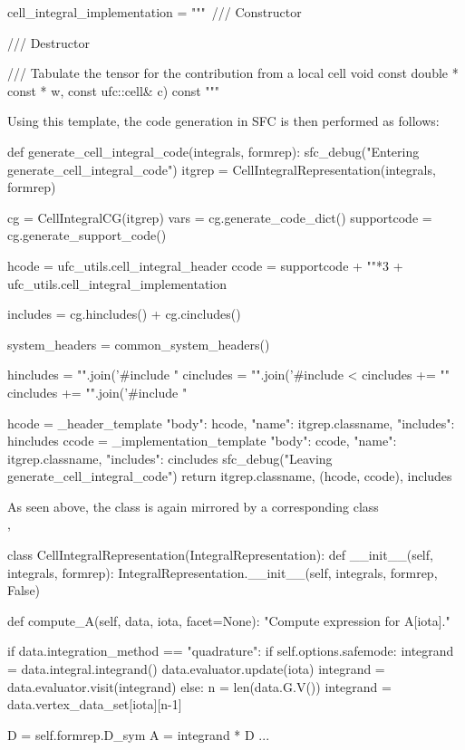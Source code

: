\begin{python}
cell_integral_implementation = """\
/// Constructor
{
}

/// Destructor
{
}

/// Tabulate the tensor for the contribution from a local cell
void %
                                    const double * const * w,
                                    const ufc::cell& c) const
{
}
"""
\end{python}
Using this template, the code generation in SFC is then performed as follows:  
\begin{python}
def generate_cell_integral_code(integrals, formrep):
    sfc_debug("Entering generate_cell_integral_code")
    itgrep = CellIntegralRepresentation(integrals, formrep)
    
    cg = CellIntegralCG(itgrep)
    vars = cg.generate_code_dict()
    supportcode = cg.generate_support_code()

    hcode = ufc_utils.cell_integral_header %
    ccode = supportcode + "\n"*3 + ufc_utils.cell_integral_implementation %
    
    includes = cg.hincludes() + cg.cincludes()

    system_headers = common_system_headers()
    
    hincludes = "\n".join('#include "%
    cincludes =  "\n".join('#include <%
    cincludes += "\n"
    cincludes += "\n".join('#include "%
    
    hcode = _header_template         %
             { "body": hcode, "name": itgrep.classname, "includes": hincludes }
    ccode = _implementation_template %
             { "body": ccode, "name": itgrep.classname, "includes": cincludes }
    sfc_debug("Leaving generate_cell_integral_code")
    return itgrep.classname, (hcode, ccode), includes
\end{python}
As seen above, the  class is again mirrored by a
corresponding class \\ 
, 
\begin{python}
class CellIntegralRepresentation(IntegralRepresentation):
    def __init__(self, integrals, formrep):
        IntegralRepresentation.__init__(self, integrals, formrep, False)
    
    def compute_A(self, data, iota, facet=None):
        "Compute expression for A[iota]."
        
        if data.integration_method == "quadrature":
            if self.options.safemode:
                integrand = data.integral.integrand()
                data.evaluator.update(iota)
                integrand = data.evaluator.visit(integrand)
            else:
                n = len(data.G.V())
                integrand = data.vertex_data_set[iota][n-1]
            
            D = self.formrep.D_sym
            A = integrand * D
            ...     
\end{python}
